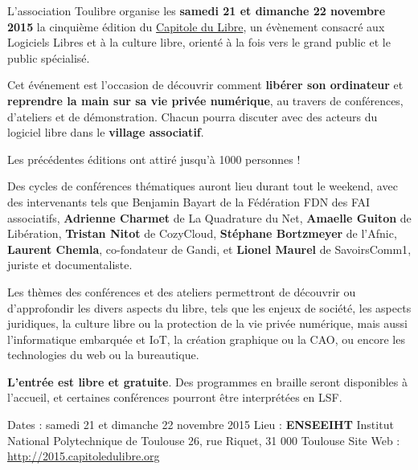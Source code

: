 
L'association Toulibre organise les \textbf{samedi 21 et dimanche 22 novembre 2015} la cinquième
édition du \href{http://capitoledulibre.org}{Capitole du Libre}, un évènement consacré aux Logiciels Libres et à la culture libre, orienté à la fois vers le grand public et le public spécialisé.

Cet événement est l'occasion de découvrir comment \textbf{libérer son ordinateur} et \textbf{reprendre la main sur sa vie privée numérique}, au travers de conférences, d'ateliers et de démonstration.
Chacun pourra discuter avec des acteurs du logiciel libre dans le \textbf{village associatif}.

Les précédentes éditions ont attiré jusqu'à 1000 personnes !

Des cycles de conférences thématiques auront lieu durant tout le weekend,
avec des intervenants tels que Benjamin Bayart de la {Fédération FDN des FAI associatifs},
\textbf{Adrienne Charmet} de {La Quadrature du Net},
\textbf{Amaelle Guiton} de {Libération},
\textbf{Tristan Nitot} de {CozyCloud},
\textbf{Stéphane Bortzmeyer} de l'{Afnic},
\textbf{Laurent Chemla}, co-fondateur de {Gandi},
et \textbf{Lionel Maurel} de {SavoirsComm1}, juriste et documentaliste.

Les thèmes des conférences et des ateliers permettront de découvrir ou d'approfondir les divers aspects du libre, tels que les enjeux de société, les aspects juridiques, la culture libre ou la protection de la vie privée numérique, mais aussi l'informatique embarquée et IoT, la création graphique ou la CAO, ou encore les technologies du web ou la bureautique.

\textbf{L'entrée est libre et gratuite}. Des programmes en braille seront disponibles à l'accueil, et certaines conférences pourront être interprétées en LSF.

Dates : samedi 21 et dimanche 22 novembre 2015
Lieu : \textbf{ENSEEIHT} Institut National Polytechnique de Toulouse
26, rue Riquet, 31 000 Toulouse
Site Web : \href{http://capitoledulibre.org}{http://2015.capitoledulibre.org}
